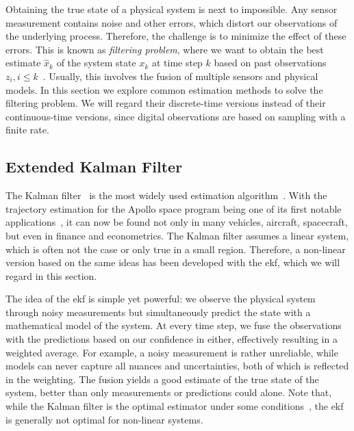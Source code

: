 Obtaining the true state of a physical system is next to impossible. Any sensor measurement contains noise and other errors, which distort our observations of the underlying process. Therefore, the challenge is to minimize the effect of these errors. This is known as \textit{filtering problem}, where we want to obtain the best estimate $\hat{x}_k$ of the system state $x_k$ at time step $k$ based on past observations $z_i, i \leq k$~\cite[p.~67]{Mitter.1996}. Usually, this involves the fusion of multiple sensors and physical models. In this section we explore common estimation methods to solve the filtering problem. We will regard their discrete-time versions instead of their continuous-time versions, since digital observations are based on sampling with a finite rate.

\subsection{Extended Kalman Filter}\label{sec:background-ekf}
The Kalman filter~\cite{Kalman.1960} is the most widely used estimation algorithm~\cite[p.~401]{Julier.2004}. With the trajectory estimation for the Apollo space program being one of its first notable applications~\cite{Grewal.2010}, it can now be found not only in many vehicles, aircraft, spacecraft, but even in finance and econometrics. The Kalman filter assumes a linear system, which is often not the case or only true in a small region. Therefore, a non-linear version based on the same ideas has been developed with the \gls{ekf}, which we will regard in this section.

The idea of the \gls{ekf} is simple yet powerful: we observe the physical system through noisy measurements but simultaneously predict the state with a mathematical model of the system. At every time step, we fuse the observations with the predictions based on our confidence in either, effectively resulting in a weighted average. For example, a noisy measurement is rather unreliable, while models can never capture all nuances and uncertainties, both of which is reflected in the weighting. The fusion yields a good estimate of the true state of the system, better than only measurements or predictions could alone. Note that, while the Kalman filter is the optimal estimator under some conditions~\cite{Maybeck.1991}, the \gls{ekf} is generally not optimal for non-linear systems.

